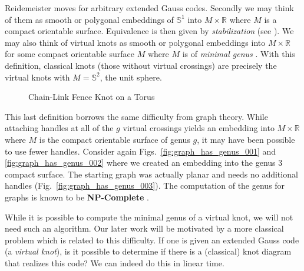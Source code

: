         Reidemeister moves for arbitrary extended Gauss codes. Secondly we may
        think of them as smooth or polygonal embeddings of $\mathbb{S}^{1}$ into
        $M\times\mathbb{R}$ where $M$ is a compact orientable surface.
        Equivalence is then given by \textit{stabilization}
        (see \cite{CarterKamadaSaitoVirtualKnotCobordisms}). We may also think
        of virtual knots as smooth or polygonal embeddings into
        $M\times\mathbb{R}$ for some compact orientable surface $M$ where $M$
        is of \textit{minimal genus} \cite{KuperbergVirtualLink}.
        With this definition, classical knots (those without virtual crossings)
        are precisely the virtual knots with $M=\mathbb{S}^{2}$,
        the unit sphere.
        \begin{figure}
            \centering
            \caption{Chain-Link Fence Knot on a Torus}
            \label{fig:chain_link_fence_knot_on_torus}
        \end{figure}
        \par\hfill\par
        This last definition borrows the same difficulty from graph theory.
        While attaching handles at all of the $g$ virtual crossings yields an
        embedding into $M\times\mathbb{R}$ where $M$ is the compact orientable
        surface of genus $g$, it may have been possible to use fewer handles.
        Consider again Figs.~\ref{fig:graph_has_genus_001} and
        \ref{fig:graph_has_genus_002} where we created an embedding into the
        genus 3 compact surface. The starting graph was actually planar and
        needs no additional handles (Fig.~\ref{fig:graph_has_genus_003}).
        The computation of the genus for graphs is known to be
        \textbf{NP-Complete} \cite{GareyJohnsonGraphCrossingNumberNPComplete}.
        \par\hfill\par
        While it is possible to compute the minimal genus of a virtual knot,
        we will not need such an algorithm. Our later work will be motivated
        by a more classical problem which is related to this difficulty.
        If one is given an extended Gauss code (a \textit{virtual knot}),
        is it possible to determine if there is a (classical) knot diagram
        that realizes this code? We can indeed do this in linear time.
        \par\hfill\par
